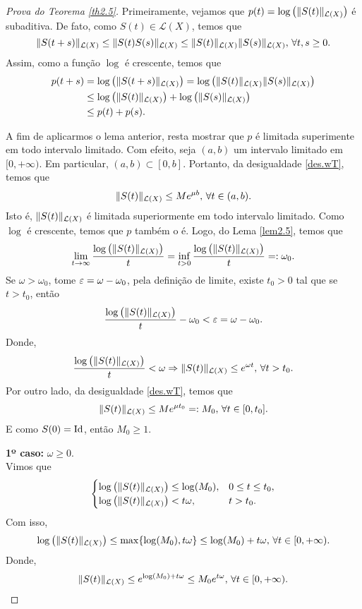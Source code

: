 \begin{proof}[Prova do Teorema \ref{th2.5}]
Primeiramente, vejamos que $p(t)=\log\left(\|S(t)\|_{\mathcal{L}(X)}\right)$ é subaditiva. De fato,
como $S(t)\in \mathcal{L}(X)$, temos que
\[\|S(t+s)\|_{\mathcal{L}(X)}\leq \|S(t)S(s)\|_{\mathcal{L}(X)}\leq \|S(t)\|_{\mathcal{L}(X)}\|S(s)\|_{\mathcal{L}(X)},\, \forall t,s\geq 0.\]
Assim, como a função $\log$ é crescente, temos que
\begin{align*}
p(t+s)& =\log\left(\|S(t+s)\|_{\mathcal{L}(X)}\right)=\log\left(\|S(t)\|_{\mathcal{L}(X)}\|S(s)\|_{\mathcal{L}(X)}\right)\\
& \leq\log\left(\|S(t)\|_{\mathcal{L}(X)}\right)+\log\left(\|S(s)\|_{\mathcal{L}(X)}\right)\\
& \leq p(t)+p(s).
\end{align*}

A fim de aplicarmos o lema anterior, resta mostrar que $p$ é limitada superimente em todo intervalo limitado. Com efeito, seja $(a,b)$ um intervalo limitado em $[0,+\infty)$. Em particular, $(a,b)\subset [0,b]$. Portanto, da desigualdade \eqref{des.wT}, temos que
\begin{equation*}
    \|S(t)\|_{\mathcal{L}(X)}\leq Me^{\mu b},\, \forall t\in (a,b).
\end{equation*}
Isto é, $\|S(t)\|_{\mathcal{L}(X)}$ é limitada superiormente em todo intervalo limitado. Como $\log$ é crescente, temos que  $p$ também o é. Logo, do Lema \ref{lem2.5}, temos que
\begin{equation*}
    \lim\limits_{t\to \infty}\frac{\log\left(\|S(t)\|_{\mathcal{L}(X)}\right)}{t}
    =\inf\limits_{t>0}\frac{\log\left(\|S(t)\|_{\mathcal{L}(X)}\right)}{t}=:\omega_0.
\end{equation*}
Se $\omega>\omega_0$, tome $\varepsilon=\omega-\omega_0$, pela definição de limite, existe $t_0>0$ tal que se $t>t_0$, então
\[\frac{\log\left(\|S(t)\|_{\mathcal{L}(X)}\right)}{t}-\omega_0<\varepsilon=\omega-\omega_0.\]
Donde, 
\[\frac{\log\left(\|S(t)\|_{\mathcal{L}(X)}\right)}{t}<\omega\Rightarrow 
\|S(t)\|_{\mathcal{L}(X)} \leq e^{\omega t},\, \forall t>t_0.\]
Por outro lado, da desigualdade \eqref{des.wT}, temos que
\[
\|S(t)\|_{\mathcal{L}(X)} \leq Me^{\mu t_0}=:M_0,\, \forall t\in [0,t_0].
\]
E como $S(0)=\operatorname{Id}$, então $M_0\geq 1$.

\noindent\textbf{1º caso:} $\omega\geq 0$.\\
Vimos que
\begin{equation*}
    \begin{cases}
    \log\left(\|S(t)\|_{\mathcal{L}(X)}\right)\leq \log(M_0), & 0\leq t\leq t_0,\\
        \log\left(\|S(t)\|_{\mathcal{L}(X)}\right)< t\omega, & t>t_0.        
    \end{cases}
\end{equation*}
Com isso, 
\begin{equation*}
 \log\left(\|S(t)\|_{\mathcal{L}(X)}\right)\leq \max\{ \log(M_0),t\omega\}\leq \log(M_0)+t\omega ,\, \forall t\in [0,+\infty).
\end{equation*}
Donde,
\begin{equation*}
    \|S(t)\|_{\mathcal{L}(X)}\leq e^{\log(M_0)+t\omega}\leq M_0e^{t\omega},\, \forall t\in [0,+\infty). 
\end{equation*}


\end{proof}
